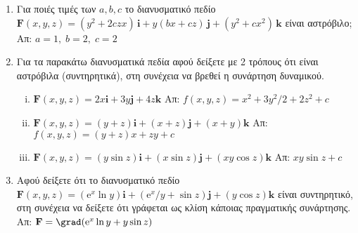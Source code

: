 





\pagestyle{askhseis}
\everymath{\displaystyle}



\begin{center}
  \minibox{\large\bfseries \textcolor{Col1}{Επικαμπύλιο Ολοκλήρωμα ΙΙου είδους}}
\end{center}

\vspace{\baselineskip}

\begin{enumerate}


  \section*{Ανεξαρτησία Διαδρομής}

  \item Για ποιές τιμές των $ a,b,c $ το διανυσματικό πεδίο $ \mathbf{F}(x,y,z) =
    (y^{2}+2czx)
    \,\mathbf{i} + y(bx+cz) \,\mathbf{j} + (y^{2}+cx^{2}) \,\mathbf{k} $ είναι 
    αστρόβιλο; \hfill Απ: $ a=1, \; b=2, \; c=2 $ 

  \item Για τα παρακάτω διανυσματικά πεδία αφού δείξετε με 2 τρόπους ότι είναι 
    αστρόβιλα (συντηρητικά), στη συνέχεια να βρεθεί η συνάρτηση δυναμικού.
    \begin{enumerate}[i)]
      \item $ \mathbf{F}(x,y,z) = 2x \mathbf{i} + 3y \mathbf{j} + 4z \mathbf{k}
        $ \hfill Απ: $ f(x,y,z) = x^{2}+ {3y^{2}}/{2} + 2z^{2} +c $ 
      \item $ \mathbf{F}(x,y,z) = (y+z) \mathbf{i} + (x+z) \mathbf{j} + (x+y) \mathbf{k}
        $ \hfill Απ: $ f(x,y,z) = (y+z)x+zy + c $ 
      \item $ \mathbf{F}(x,y,z) = (y \sin{z}) \mathbf{i} + (x \sin{z}) \mathbf{j} + (xy
        \cos{z}) \mathbf{k} $ \hfill Απ: $ xy \sin{z} + c $ 
    \end{enumerate}

  \item Αφού δείξετε ότι το διανυσματικό πεδίο $ \mathbf{F}(x,y,z) = (\mathrm{e}^{x}
    \ln{y}) \mathbf{i} +
    ({\mathrm{e}^{x}}/{y} + \sin{z}) \mathbf{j} + (y \cos{z}) \mathbf{k} $ 
    είναι συντηρητικό, στη συνέχεια να δείξετε ότι γράφεται ως κλίση κάποιας 
    πραγματικής συνάρτησης. \hfill Απ: $ \mathbf{F}= \grad (\mathrm{e}^{x} \ln{y} + y
    \sin{z}) $ 


\end{enumerate}
